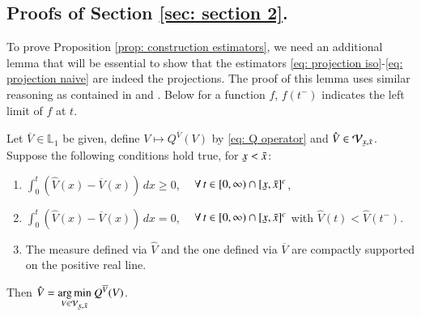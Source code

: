     
\subsection{ Proofs of Section \ref{sec: section 2}.}

To prove Proposition \ref{prop: construction estimators}, we need an additional lemma that will be essential to show that the estimators \eqref{eq: projection iso}-\eqref{eq: projection naive} are indeed the projections. The proof of this lemma uses similar reasoning as contained in \cite{23} and \cite{24}. Below for a function $f$, $f(t^{-})$ indicates the left limit of $f$ at $t$.
\begin{lemma}\label{lemma: minimization L^2}
Let $\overline{V} \in \mathbb{L}_1$ be given, define $V \mapsto Q^{\overline{V}}(V)$ by \eqref{eq: Q operator} and $\hat{V} \in \mathcal{V}_{\scriptstyle{\ubar{x},\bar{x}}}$.
Suppose the following conditions hold true, for $\ubar{x} < \bar{x}$: 
    \begin{enumerate}
        \item $ \int_{0}^{t} (\hat{V}(x) - \overline{V}(x) ) \, dx \geq 0$,  $\quad \forall \, t \in [0,\infty) \cap [\ubar{x},\bar{x}]^c$,
        \item $ \int_{0}^{t} ( \hat{V}(x) - \overline{V}(x) ) \, dx = 0$, $\quad \forall \, t \in [0,\infty) \cap [\ubar{x},\bar{x}]^c$ with $\hat{V}(t)<\hat{V}(t^{-})$.
        \item The measure defined via $\hat{V}$ and the one defined via $\overline{V}$ are compactly supported on the positive real line.
    \end{enumerate}
    Then $\hat{V} = \underset{V \in \mathcal{V}_{\scriptstyle{\ubar{x},\bar{x}}}}{\argmin} \: Q^{\overline{V}}(V)$.
\end{lemma}
